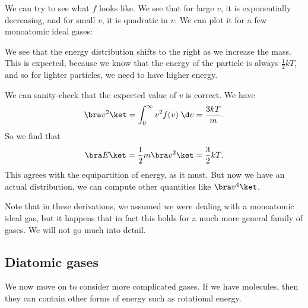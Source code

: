 \documentclass[a4paper]{article}
\begin{document}
We can try to see what $f$ looks like. We see that for large $v$, it is exponentially decreasing, and for small $v$, it is quadratic in $v$. We can plot it for a few monoatomic ideal gases:
\begin{center}
\end{center}
We see that the energy distribution shifts to the right as we increase the mass. This is expected, because we know that the energy of the particle is always $\frac{1}{2}kT$, and so for lighter particles, we need to have higher energy.

We can sanity-check that the expected value of $v$ is correct. We have
\[
  \bra v^2\ket = \int_0^\infty v^2 f(v) \;\d v = \frac{3kT}{m}.
\]
So we find that
\[
  \bra E\ket = \frac{1}{2} m\bra v^2\ket = \frac{3}{2} kT.
\]
This agrees with the equipartition of energy, as it must. But now we have an actual distribution, we can compute other quantities like $\bra v^4\ket$.

Note that in these derivations, we assumed we were dealing with a monoatomic ideal gas, but it happens that in fact this holds for a much more general family of gases. We will not go much into detail.

\subsection{Diatomic gases}
We now move on to consider more complicated gases. If we have molecules, then they can contain other forms of energy such as rotational energy.
\end{document}

